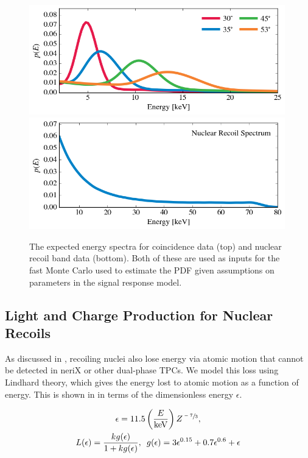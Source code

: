 \begin{figure}[t]
        \centering
	\includegraphics[width=0.99\textwidth]{nerix_energy_spectrum_coin}
	\includegraphics[width=0.99\textwidth]{nerix_energy_spectrum_band}
	\caption{The expected energy spectra for coincidence data (top) and nuclear recoil band data (bottom).  Both of these are used as inputs for the fast Monte Carlo used to estimate the PDF given assumptions on parameters in the signal response model.}
	\label{fig:nerix_mc_energy_spectra}
\end{figure}


\subsection{Light and Charge Production for Nuclear Recoils}
\label{sec:nerix_observables_production}

As discussed in , recoiling nuclei also lose energy via atomic motion that cannot be detected in neriX or other dual-phase TPCs.  We model this loss using Lindhard theory, which gives the energy lost to atomic motion as a function of energy.  This is shown in  in terms of the dimensionless energy $\epsilon$.

\begin{equation}
        \label{eqn:nerix_lindhard}
        \begin{gathered}
                \epsilon = 11.5 \left( \frac{E}{\textrm{keV}} \right) Z^{\sfrac{-7}{3}}, \\
                L(\epsilon) = \frac{k g(\epsilon)}{1 + k g(\epsilon)}, \, \, \, g(\epsilon) = 3 \epsilon^{0.15} + 0.7 \epsilon^{0.6} + \epsilon
        \end{gathered}
\end{equation}

